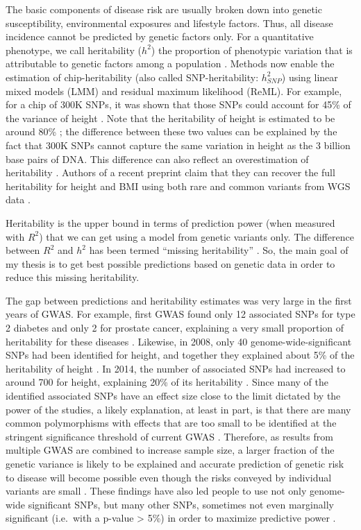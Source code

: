 The basic components of disease risk are usually broken down into genetic susceptibility, environmental exposures and lifestyle factors. Thus, all disease incidence cannot be predicted by genetic factors only.
For a quantitative phenotype, we call heritability ($h^2$) the proportion of phenotypic variation that is attributable to genetic factors among a population \cite[]{visscher2008heritability}.
Methods now enable the estimation of chip-heritability (also called SNP-heritability: $h^2_{SNP}$) using linear mixed models (LMM) and residual maximum likelihood (ReML). For example, for a chip of 300K SNPs, it was shown that those SNPs could account for 45\% of the variance of height \cite[]{yang2010common}.
Note that the heritability of height is estimated to be around 80\% \cite[]{silventoinen2003determinants,visscher2006assumption}; the difference between these two values can be explained by the fact that 300K SNPs cannot capture the same variation in height as the 3 billion base pairs of DNA. This difference can also reflect an overestimation of heritability \cite[]{visscher2008heritability}. Authors of a recent preprint claim that they can recover the full heritability for height and BMI using both rare and common variants from WGS data \cite[]{wainschtein2019recovery}.

Heritability is the upper bound in terms of prediction power (when measured with $R^2$) that we can get using a model from genetic variants only.
The difference between $R^2$ and $h^2$ has been termed ``missing heritability'' \cite[]{manolio2009finding}. So, the main goal of my thesis is to get best possible predictions based on genetic data in order to reduce this missing heritability.

The gap between predictions and heritability estimates was very large in the first years of GWAS.
For example, first GWAS found only 12 associated SNPs for type 2 diabetes and only 2 for prostate cancer, explaining a very small proportion of heritability for these diseases \cite[]{jakobsdottir2009interpretation}. 
Likewise, in 2008, only 40 genome-wide-significant SNPs had been identified for height, and together they explained about 5\% of the heritability of height \cite[]{manolio2009finding}. In 2014, the number of associated SNPs had increased to around 700 for height, explaining 20\% of its heritability \cite[]{wood2014defining}.
Since many of the identified associated SNPs have an effect size close to the limit dictated by the power of the studies, a likely explanation, at least in part, is that there are many common polymorphisms with effects that are too small to be identified at the stringent significance threshold of current GWAS \cite[]{wray2008prediction}.
Therefore, as results from multiple GWAS are combined to increase sample size, a larger fraction of the genetic variance is likely to be explained and accurate prediction of genetic risk to disease will become possible even though the risks conveyed by individual variants are small \cite[]{wray2008prediction,wray2018common}.
These findings have also led people to use not only genome-wide significant SNPs, but many other SNPs, sometimes not even marginally significant (i.e.\ with a p-value > 5\%) in order to maximize predictive power \cite[]{purcell2009common,Dudbridge2013,wray2014research}.


